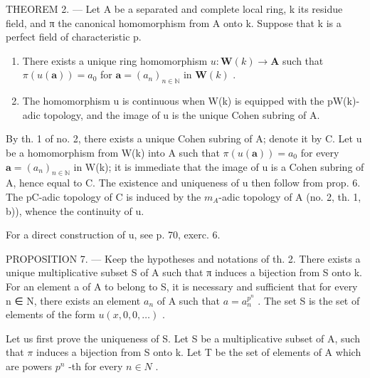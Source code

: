 THEOREM 2. --- Let A be a separated and complete local ring, k its residue field, and π the canonical homomorphism from A onto k. Suppose that k is a perfect field of characteristic p.

\begin{enumerate}
\def\labelenumi{\alph{enumi})}
\item
  There exists a unique ring homomorphism \(u: \mathbf{W}(k) \to \mathbf{A}\) such that \(\pi(u(\boldsymbol{a})) = a_0\) for \(\boldsymbol{a} = (a_n)_{n \in \mathbb{N}}\) in \(\mathbf{W}(k)\) .
\item
  The homomorphism u is continuous when W(k) is equipped with the pW(k)-adic topology, and the image of u is the unique Cohen subring of A.
\end{enumerate}

By th. 1 of no. 2, there exists a unique Cohen subring of A; denote it by C. Let u be a homomorphism from W(k) into A such that \(\pi(u(\boldsymbol{a})) = a_0\) for every \(\boldsymbol{a} = (a_n)_{n \in \mathbb{N}}\) in W(k); it is immediate that the image of u is a Cohen subring of A, hence equal to C. The existence and uniqueness of u then follow from prop. 6. The pC-adic topology of C is induced by the \(m_{A}\)-adic topology of A (no. 2, th. 1, b)), whence the continuity of u.

For a direct construction of u, see p. 70, exerc. 6.

PROPOSITION 7. --- Keep the hypotheses and notations of th. 2. There exists a unique multiplicative subset S of A such that π induces a bijection from S onto k. For an element a of A to belong to S, it is necessary and sufficient that for every n ∈ N, there exists an element \(a_{n}\) of A such that \(a = a_{n}^{p^{n}}\) . The set S is the set of elements of the form \(u(x, 0, 0, \ldots)\) .

Let us first prove the uniqueness of S. Let S be a multiplicative subset of A, such that \(\pi\) induces a bijection from S onto k. Let T be the set of elements of A which are powers \(p^{n}\) -th for every \(n \in N\) .

